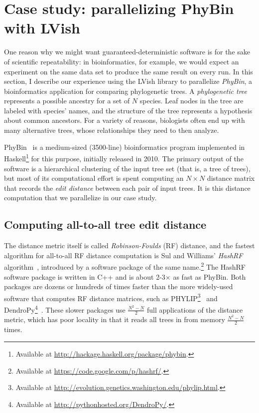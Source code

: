 \section{Case study: parallelizing PhyBin with LVish}\label{s:lvish-phybin}

One reason why we might want guaranteed-deterministic software is for
the sake of scientific repeatability: in bioinformatics, for example,
we would expect an experiment on the same data set to produce the same
result on every run.  In this section, I describe our experience using
the LVish library to parallelize \emph{PhyBin}, a bioinformatics
application for comparing phylogenetic trees.  A \emph{phylogenetic
  tree} represents a possible ancestry for a set of $N$ species.  Leaf
nodes in the tree are labeled with species' names, and the structure
of the tree represents a hypothesis about common ancestors. For a
variety of reasons, biologists often end up with many alternative
trees, whose relationships they need to then analyze.

PhyBin~\cite{PhyBin} is a medium-sized (3500-line) bioinformatics
program implemented in Haskell\footnote{Available at
  \url{http://hackage.haskell.org/package/phybin}.} for this purpose,
initially released in 2010.  The primary output of the software is a
hierarchical clustering of the input tree set (that is, a tree of
trees), but most of its computational effort is spent computing an $N
\times N$ distance matrix that records the \emph{edit distance}
between each pair of input trees.  It is this distance computation
that we parallelize in our case study.

\subsection{Computing all-to-all tree edit distance}

The distance metric itself is called \emph{Robinson-Foulds} (RF)
distance, and the fastest algorithm for all-to-all RF distance
computation is Sul and Williams' \emph{HashRF}
algorithm~\cite{hashrf}, introduced by a software package of the same
name.\footnote{Available at \url{https://code.google.com/p/hashrf/}.}
The HashRF software package is written in C++ and is about 2-3$\times$
as fast as PhyBin.  Both packages are dozens or hundreds of times
faster than the more widely-used software that computes RF distance
matrices, such as PHYLIP\footnote{Available at
  \url{http://evolution.genetics.washington.edu/phylip.html}.}~\cite{phylip}
and DendroPy\footnote{Available at
  \url{http://pythonhosted.org/DendroPy/}.}~\cite{dendropy}.  These
slower packages use $\frac{N^2-N}{2}$ full applications of the
distance metric, which has poor locality in that it reads all trees in
from memory $\frac{N^2-N}{2}$ times.

